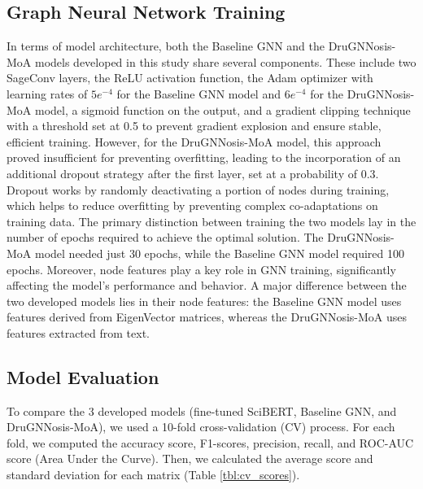 \documentclass[journal,twoside,web]{ieeecolor}
\begin{document}
\subsection{Graph Neural Network Training}
In terms of model architecture, both the Baseline GNN and the DruGNNosis-MoA models developed in this study share several components.
These include two SageConv layers, the ReLU activation function, the Adam optimizer with learning rates of $5e^{-4}$ for the Baseline GNN model and  $6e^{-4}$ for the DruGNNosis-MoA model, a sigmoid function on the output, and a gradient clipping technique with a threshold set at 0.5 to prevent gradient explosion and ensure stable, efficient training.
However, for the DruGNNosis-MoA model, this approach proved insufficient for preventing overfitting, leading to the incorporation of an additional dropout strategy after the first layer, set at a probability of 0.3.
Dropout works by randomly deactivating a portion of nodes during training, which helps to reduce overfitting by preventing complex co-adaptations on training data.
The primary distinction between training the two models lay in the number of epochs required to achieve the optimal solution.
The DruGNNosis-MoA model needed just 30 epochs, while the Baseline GNN model required 100 epochs.
Moreover, node features play a key role in GNN training, significantly affecting the model's performance and behavior. %
A major difference between the two developed models lies in their node features: the Baseline GNN model uses features derived from EigenVector matrices, whereas the DruGNNosis-MoA uses features extracted from text.

\subsection{Model Evaluation}
To compare the 3 developed models (fine-tuned SciBERT, Baseline GNN, and DruGNNosis-MoA), we used a 10-fold cross-validation (CV) process.
For each fold, we computed the accuracy score, F1-scores, precision, recall, and ROC-AUC score (Area Under the Curve).
Then, we calculated the average score and standard deviation for each matrix (Table \ref{tbl:cv_scores}).
\end{document}
